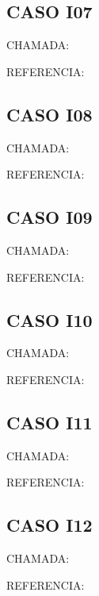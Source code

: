 \documentclass{undftex}
\begin{document}
\begin{refsection}\section*{CASO I07}\noindent CHAMADA:  \par\noindent REFERENCIA:\par\printbibliography[heading=none]\end{refsection}\clearpage
\begin{refsection}\section*{CASO I08}\noindent CHAMADA:  \par\noindent REFERENCIA:\par\printbibliography[heading=none]\end{refsection}\clearpage
\begin{refsection}\section*{CASO I09}\noindent CHAMADA:  \par\noindent REFERENCIA:\par\printbibliography[heading=none]\end{refsection}\clearpage
\begin{refsection}\section*{CASO I10}\noindent CHAMADA:  \par\noindent REFERENCIA:\par\printbibliography[heading=none]\end{refsection}\clearpage
\begin{refsection}\section*{CASO I11}\noindent CHAMADA:  \par\noindent REFERENCIA:\par\printbibliography[heading=none]\end{refsection}\clearpage
\begin{refsection}\section*{CASO I12}\noindent CHAMADA:  \par\noindent REFERENCIA:\par\printbibliography[heading=none]\end{refsection}\clearpage
\end{document}
